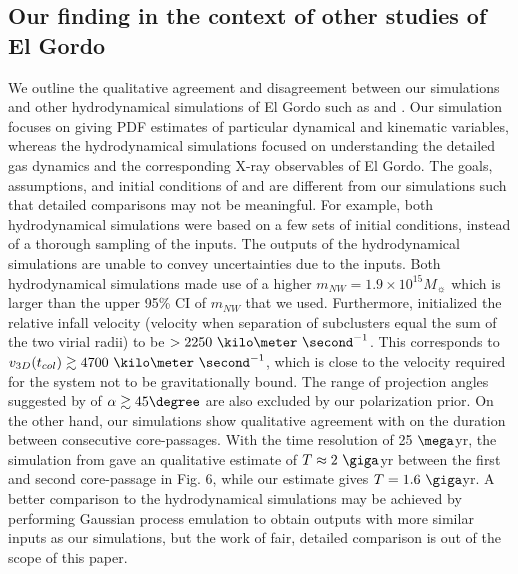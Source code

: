 \subsection{Our finding in the context of other studies of El Gordo}
We outline the qualitative agreement and disagreement between our
simulations and other hydrodynamical simulations of El Gordo such as
\cite{Donnert13} and \cite{Molnar14}. Our simulation focuses on giving PDF
estimates of particular dynamical and kinematic variables, whereas the
hydrodynamical simulations focused on understanding the detailed gas dynamics
and the corresponding X-ray observables of El Gordo. The goals,
assumptions, and initial conditions of \cite{Donnert13} and \cite{Molnar14}
are different from our simulations such that detailed comparisons may not
be meaningful. 
For example, both hydrodynamical simulations were based on a few sets of initial
conditions, instead of a thorough sampling of the inputs. The outputs of
the hydrodynamical simulations are unable to convey uncertainties due to
the inputs. Both hydrodynamical simulations made use of a higher $m_{NW} =
1.9 \times 10^{15} M_{\sun}$ which is larger than the upper 95\% CI of $m_{NW}$
that we used. Furthermore, \cite{Molnar14} initialized the relative infall velocity (velocity when separation of subclusters equal the sum
of the two virial radii) to be $> 2250~\kilo \meter~
\second^{-1}$. This corresponds to $v_{3D}(t_{col}) \gtrsim 4700~\kilo
\meter~\second^{-1}$, which is close to the velocity required for the
system not to be gravitationally bound. The range of projection angles suggested by
\cite{Molnar14} of $\alpha \gtrsim 45\degree$ are also excluded by our polarization prior.  On the other hand, our simulations show qualitative agreement with
\cite{Donnert13} on the duration between consecutive core-passages. With
the time resolution of 25 $\mega$yr, the simulation from \cite{Donnert13} gave an
qualitative estimate of  $T\approx 2~\giga$yr between the first and second
core-passage in Fig. 6, while our estimate gives $T
= 1.6~\giga$yr.  A better comparison to the hydrodynamical simulations
may be achieved by performing Gaussian process emulation to obtain outputs
with more similar inputs as our simulations, but the work of fair, detailed
comparison is out of the scope of this paper. 

